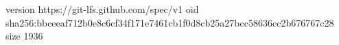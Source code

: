 version https://git-lfs.github.com/spec/v1
oid sha256:bbceeaf712b0e8c6cf34f171e7461cb1f0d8cb25a27bcc58636cc2b676767c28
size 1936
